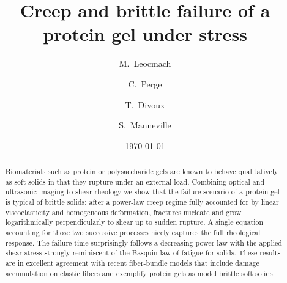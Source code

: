 \documentclass[twocolumn,superscriptaddress,showpacs,preprintnumbers,amsmath,amssymb,prl]{revtex4}
\begin{document}

 \title{Creep and brittle failure of a protein gel under stress}

\author{M.~Leocmach}
\author{C.~Perge}
\author{T.~Divoux}
\author{S.~Manneville}

\date{\today}

\begin{abstract}
Biomaterials such as protein or polysaccharide gels are known to behave qualitatively as soft solids in that they rupture under an external load. Combining optical and ultrasonic imaging to shear rheology we show that the failure scenario of a protein gel is typical of brittle solids: after a power-law creep regime fully accounted for by linear viscoelasticity and homogeneous deformation, fractures nucleate and grow logarithmically perpendicularly to shear up to sudden rupture. A single equation accounting for those two successive processes nicely captures the full rheological response. The failure time surprisingly follows a decreasing power-law with the applied shear stress strongly reminiscent of the Basquin law of fatigue for solids. These results are in excellent agreement with recent fiber-bundle models that include damage accumulation on elastic fibers and exemplify protein gels as model brittle soft solids.
\end{abstract}

\pacs{}
\maketitle
\end{document}
